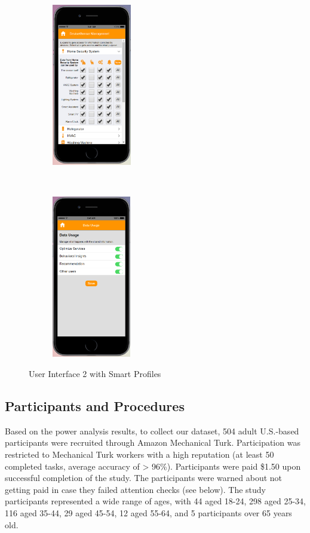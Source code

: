 \begin{figure}[htb]
\begin{subfigure}[t]{0.2\textwidth}
	\end{subfigure}%
	~~~~~
	\begin{subfigure}[t]{0.2\textwidth}
		\centering
		\includegraphics[height=2.8in]{figures/ui2sp4.png}
	\end{subfigure}%
	~~~~~
	\begin{subfigure}[t]{0.2\textwidth}
		\centering
		\includegraphics[height=2.8in]{figures/ui2sp5.png}
	\end{subfigure}%
	\caption{User Interface 2 with Smart Profiles}
	\label{fig:ui2Profiles}
\end{figure}

\subsection{Participants and Procedures}
Based on the power analysis results, to collect our dataset, 504 adult U.S.-based participants were recruited through Amazon Mechanical Turk. Participation was restricted to Mechanical Turk workers with a high reputation (at least 50 completed tasks, average accuracy of > 96\%). Participants were paid \$1.50 upon successful completion of the study. The participants were warned about not getting paid in case they failed attention checks (see below). The study participants represented a wide range of ages, with 44 aged 18-24, 298 aged 25-34, 116 aged 35-44, 29 aged 45-54, 12 aged 55-64, and 5 participants over 65 years old.

